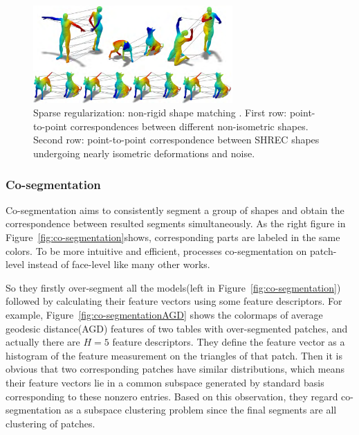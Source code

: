 \begin{figure}[ht]
  \centering
  \includegraphics[width=3in]{images/matching_L1}
  \caption{Sparse regularization: non-rigid shape matching \cite{wang2014decoupling}. First row: point-to-point correspondences between different non-isometric shapes. Second row: point-to-point correspondence between SHREC shapes undergoing nearly isometric deformations and noise.}
  \label{fig:non-rigid matching}
\end{figure}


\subsubsection{Co-segmentation}
\label{subsubsec:co-segmentation}

Co-segmentation aims to consistently segment a group of shapes and obtain the correspondence between resulted segments simultaneously. As the right figure in Figure~\ref{fig:co-segmentation}shows, corresponding parts are labeled in the same colors.
To be more intuitive and efficient, \cite{hu2012co} processes co-segmentation on patch-level instead of face-level like many other works.

So they firstly over-segment all the models(left in Figure~\ref{fig:co-segmentation}) followed by calculating their feature vectors using some feature descriptors.
For example, Figure~\ref{fig:co-segmentationAGD} shows the colormaps of average geodesic distance(AGD) features of two tables with over-segmented patches, and actually there are $H=5$ feature descriptors.
They define the feature vector as a histogram of the feature measurement on the triangles of that patch.
Then it is obvious that two corresponding patches have similar distributions, which means their feature vectors lie in a common subspace generated by standard basis corresponding to these nonzero entries.
Based on this observation, they regard co-segmentation as a subspace clustering problem since the final segments are all clustering of patches.

